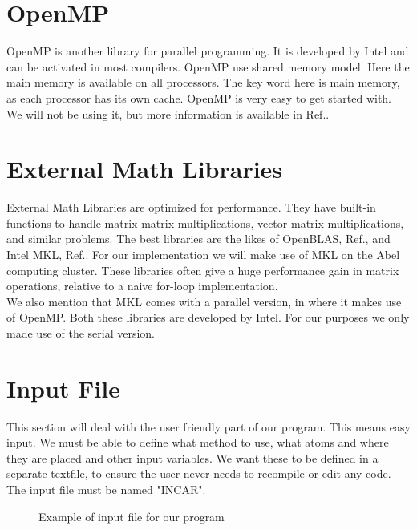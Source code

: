 \section{OpenMP}
OpenMP is another library for parallel programming. It is developed by Intel and can be activated in most compilers. OpenMP use shared memory model. Here the main memory is available on all processors. The key word here is main memory, as each processor has its own cache. OpenMP is very easy to get started with. We will not be using it, but more information is available in Ref.\cite{openmp_citation_po_g}.

\section{External Math Libraries}
External Math Libraries are optimized for performance. They have built-in functions to handle matrix-matrix multiplications, vector-matrix multiplications, and similar problems. The best libraries are the likes of OpenBLAS, Ref.\cite{openblas_citation}, and Intel MKL, Ref.\cite{mkl_citation}. For our implementation we will make use of MKL on the Abel computing cluster. These libraries often give a huge performance gain in matrix operations, relative to a naive for-loop implementation. \\

We also mention that MKL comes with a parallel version, in where it makes use of OpenMP. Both these libraries are developed by Intel. For our purposes we only made use of the serial version. 









\section{Input File}
This section will deal with the user friendly part of our program. This means easy input. We must be able to define what method to use, what atoms and where they are placed and other input variables. We want these to be defined in a separate textfile, to ensure the user  never needs to recompile or edit any code. The input file must be named "INCAR". \\

\begin{figure}[h!]
\begin{center}
\caption{Example of input file for our program}
\label{fig:inputfile100}
\end{center}
\end{figure}

